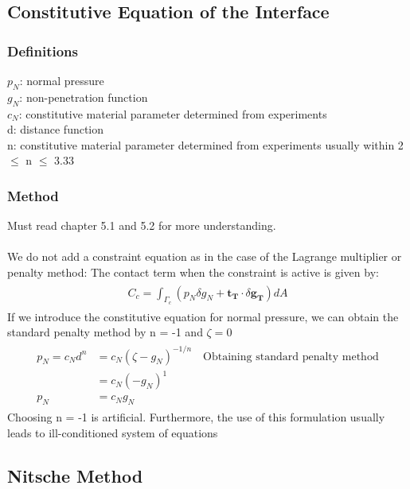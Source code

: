 \documentclass[12pt,3p]{article}
\numberwithin{equation}{section}
\begin{document}
\subsection{Constitutive Equation of the Interface}
\subsubsection{Definitions}
$p_N$: normal pressure \\
$g_N$: non-penetration function \\
$c_N$: constitutive material parameter determined from experiments \\
d: distance function \\
n: constitutive material parameter determined from experiments usually within 2 $\leq$ n $\leq$ 3.33 

\subsubsection{Method}
Must read chapter 5.1 and 5.2 for more understanding. \\ \\
We do not add a constraint equation as in the case of the Lagrange multiplier or penalty method: The contact term when the constraint is active is given by:
\begin{align}\label{640}
\begin{split}
C_c = \int_{\Gamma_c} (p_N \delta g_N + \mathbf{t_T} \cdot \delta \mathbf{g_T}) dA
\end{split}
\end{align}
If we introduce the constitutive equation for normal pressure, we can obtain the standard penalty method by n = -1 and $\zeta = 0$
\begin{align}\label{512}
\begin{split}
p_N = c_N d^n &= c_N (\zeta - g_N)^{-1/n} \quad \text{Obtaining standard penalty method} \\
			&= c_N (- g_N)^1 \\
		 p_N &= c_N g_N
\end{split}
\end{align}
Choosing n = -1 is artificial. Furthermore, the use of this formulation usually leads to ill-conditioned system of equations

\subsection{Nitsche Method}
\end{document}
